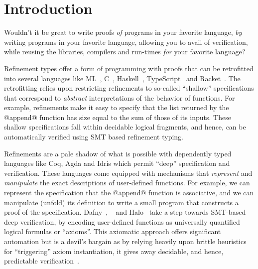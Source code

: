 \section{Introduction}\label{sec:intro}

Wouldn't it be great to write proofs \emph{of}
programs in your favorite language, \emph{by}
writing programs in your favorite language,
allowing you to avail of verification, while
reusing the libraries, compilers and run-times
\emph{for} your favorite language?

Refinement types \citep{ConstableS87,Rushby98} offer a
form of programming with proofs that can be
retrofitted into several languages like
ML~\cite{pfenningxi98,GordonRefinement09,LiquidPLDI08},
C~\cite{deputy,LiquidPOPL10},
Haskell~\citep{Vazou14}, TypeScript~\cite{Vekris16}
and Racket~\cite{RefinedRacket}.
%
The retrofitting relies upon restricting refinements
to so-called ``shallow'' specifications that
correspond to \emph{abstract} interpretations
of the behavior of functions.
%
For example, refinements make it easy to specify
that the list returned by the @append@ function
has size equal to the sum of those of its inputs.
%
These shallow specifications fall within decidable
logical fragments, and hence, can be automatically
verified using SMT based refinement typing.

Refinements are a pale shadow of what is possible
with dependently typed languages like Coq, Agda
and Idris which permit ``deep'' specification
and verification.
%
These languages come equipped with mechanisms
that \emph{represent} and \emph{manipulate} the
exact descriptions of user-defined functions.
%
For example, we can represent the specification
that the @append@ function is associative, and we
can manipulate (unfold) its definition to write a
small program that constructs a proof of the
specification.
%
Dafny~\citep{dafny}, \fstar~\citep{fstar} and
Halo~\citep{halo} take a step towards
SMT-based deep verification, by encoding
user-defined functions as universally
quantified logical formulas or ``axioms''.
%
This axiomatic approach offers significant automation
but is a devil's bargain as by relying heavily upon
brittle heuristics for ``triggering'' axiom instantiation,
it gives away decidable, and hence, predictable
verification~\citep{Leino16}.
%
%

